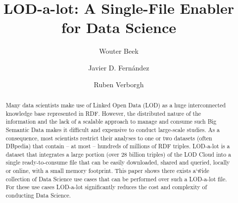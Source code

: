 \documentclass[runningheads,a4paper]{llncs}
\begin{document}
\mainmatter

\title{LOD-a-lot: A Single-File Enabler for Data Science}
\author{Wouter Beek \and
Javier D. Fernández \and
Ruben Verborgh}
\maketitle

\begin{abstract}
Many data scientists make use of Linked Open Data (LOD) as a huge interconnected knowledge base represented in RDF. However, the distributed nature of the information and the lack of a scalable approach to manage and consume such Big Semantic Data makes it difficult and expensive to conduct large-scale studies. As a consequence, most scientists restrict their analyses to one or two datasets (often DBpedia) that contain -- at most -- hundreds of millions of RDF triples. LOD-a-lot is a dataset that integrates a large portion (over 28 billion triples) of the LOD Cloud into a single ready-to-consume file that can be easily downloaded, shared and queried, locally or online, with a small memory footprint. This paper shows there exists a\char`\~wide collection of Data Science use cases that can be performed over such a LOD-a-lot file. For these use cases LOD-a-lot significantly reduces the cost and complexity of conducting Data Science. 

\end{abstract}
\end{document}
